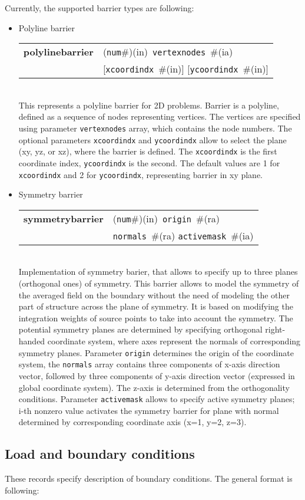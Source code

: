 \documentclass[a4paper]{article}
\newcommand{\param}[1]{\texttt{#1}} %
\newcommand{\optional}[1]{[#1]} %
\newcommand{\field}[2]{\param{#1}~\#{\tiny(#2)}} %
\newcommand{\optField}[2]{\optional{\field{#1}{#2}}}
\newcommand{\componentNum}{(\param{num}\#){\tiny(in)}} %
\newcommand{\entKeywordInst}[1]{\textbf{#1}} %
\newenvironment{record}[1][]{\begin{tabular}{|ll}}{\end{tabular}\\}
\newcommand{\recentry}[2]{{#1}&{#2}\\}
\newcounter{rcc}
\newenvironment{record}[1][\textwidth]{\setcounter{rcc}{0}\rowcolors{1}{lightgray}{lightgray}\tabularx{#1}{llR} \hline}
               {\endtabularx}
\newcommand{\recentry}[2]{\ifthenelse{\value{rcc}>0}{$\backslash$ \\}{\setcounter{rcc}{1}}{#1}&{#2}&}
\begin{document}
Currently, the supported barrier types are following:
\begin{itemize}
\item
  Polyline barrier

\begin{record}[0.9\textwidth]
  \recentry{\entKeywordInst{polylinebarrier}}{\componentNum\ \field{vertexnodes}{ia}}
  \recentry{}{\optField{xcoordindx}{in} \optField{ycoordindx}{in}}
\end{record}
This represents a polyline barrier for 2D problems. Barrier is a
polyline, defined as a sequence of nodes representing vertices.
The vertices are specified using parameter \param{vertexnodes} array,
which contains the node numbers. The optional parameters
\param{xcoordindx} and \param{ycoordindx} allow to select the plane
(xy, yz, or xz), where the barrier is defined. The \param{xcoordindx} is the
first coordinate index, \param{ycoordindx} is the second. The default values
are 1 for \param{xcoordindx} and 2 for \param{ycoordindx}, representing barrier in xy plane.
\item Symmetry barrier

\begin{record}[0.9\textwidth]
  \recentry{\entKeywordInst{symmetrybarrier}}{\componentNum\ \field{origin}{ra}}
  \recentry{}{\field{normals}{ra} \field{activemask}{ia}}
\end{record}
Implementation of symmetry barier, that allows to specify up to three planes (orthogonal ones) of symmetry.
This barrier allows to  model the symmetry of the averaged field on the boundary without
the need of modeling the other part of structure across the plane of symmetry.
It is based on modifying the integration weights of source points to take into account
the symmetry.
The potential symmetry planes are determined by specifying orthogonal right-handed coordinate system,
where axes represent the normals of corresponding symmetry planes.
Parameter \param{origin} determines the origin of the coordinate system, the \param{normals} array
contains three components of x-axis direction vector,
followed by three components of y-axis direction vector (expressed in global coordinate system).
The z-axis is determined from the orthogonality conditions.
Parameter \param{activemask} allows to specify active symmetry planes; i-th nonzero value activates the symmetry barrier for plane
with normal determined by corresponding coordinate axis (x=1, y=2, z=3).
\end{itemize}

\subsection{Load and boundary conditions}
\label{_LoadBoundaryInitialConditions}
These records specify description of  boundary conditions. The general format is
following:
\end{document}
